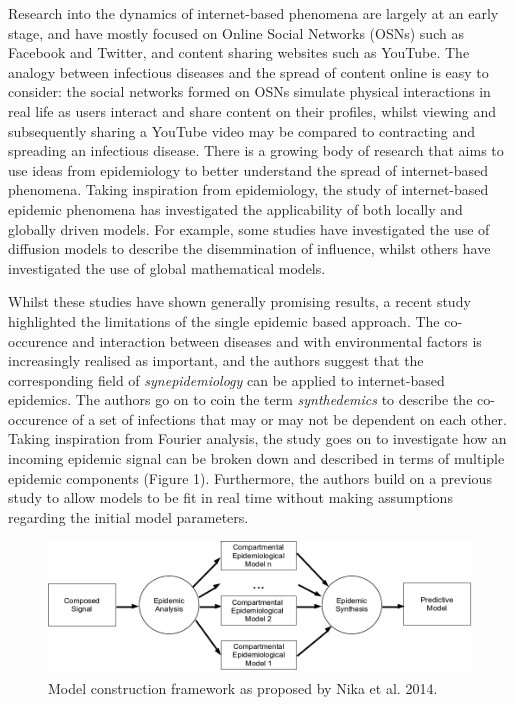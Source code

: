 \documentclass[11pt, a4paper, oneside,titlepage]{article}
\begin{document}
Research into the dynamics of internet-based phenomena are largely at
an early stage, and have mostly focused on Online Social Networks
(OSNs) such as Facebook and Twitter, and content sharing websites such
as YouTube.\cite{hartmann, bieber} The analogy between infectious
diseases and the spread of content online is easy to consider: the
social networks formed on OSNs simulate physical interactions in real
life as users interact and share content on their profiles, whilst
viewing and subsequently sharing a YouTube video may be compared to
contracting and spreading an infectious disease. There is a growing
body of research that aims to use ideas from epidemiology to better
understand the spread of internet-based phenomena. \cite{marily2013,
  meme, wang} Taking inspiration from epidemiology, the study of
internet-based epidemic phenomena has investigated the applicability
of both locally and globally driven models. For example, some studies
have investigated the use of diffusion models to describe the
disemmination of influence, whilst others have investigated the use of
global mathematical models.\cite{marily2013, meme, wang, hu}

Whilst these studies have shown generally promising results, a recent
study highlighted the limitations of the single epidemic based
approach.\cite{marily2013} The co-occurence and interaction between
diseases and with environmental factors is increasingly realised as
important, and the authors suggest that the corresponding field of
\emph{synepidemiology} can be applied to internet-based
epidemics.\cite{singer, bastos} The authors go on to coin the term
\emph{synthedemics} to describe the co-occurence of a set of
infections that may or may not be dependent on each
other.\cite{marily2014} Taking inspiration from Fourier analysis, the
study goes on to investigate how an incoming epidemic signal can be
broken down and described in terms of multiple epidemic components
(Figure 1). Furthermore, the authors build on a previous study to
allow models to be fit in real time without making assumptions
regarding the initial model parameters.




 \begin{figure}[ht!]
\centering
\includegraphics[width=140mm]{marily2014.png}
\caption{Model construction framework as proposed by Nika et al. 2014.\cite{marily2014}}
\label{sir}
\end{figure}
\end{document}
